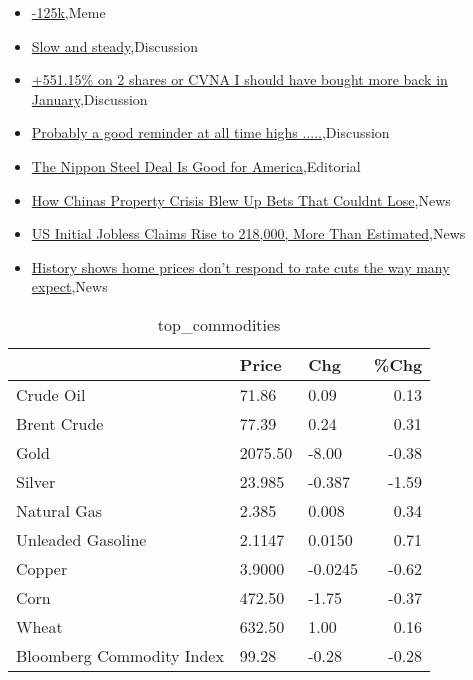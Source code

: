 \documentclass{article}%
\begin{document}
%
\begin{itemize}%
\item%
\href{https://reddit.com/r/wallstreetbets/comments/18tidzq/125k/}{-125k},Meme%
\item%
\href{https://reddit.com/r/StockMarket/comments/18tf3ja/slow\_and\_steady/}{Slow and steady},Discussion%
\item%
\href{https://reddit.com/r/StockMarket/comments/18t4gma/55115\_on\_2\_shares\_or\_cvna\_i\_should\_have\_bought/}{+551.15\% on 2 shares or CVNA I should have bought more back in January},Discussion%
\item%
\href{https://reddit.com/r/StockMarket/comments/18syo4v/probably\_a\_good\_reminder\_at\_all\_time\_highs/}{Probably a good reminder at all time highs .....},Discussion%
\item%
\href{https://reddit.com/r/Economics/comments/18t8tnw/the\_nippon\_steel\_deal\_is\_good\_for\_america/}{The Nippon Steel Deal Is Good for America},Editorial%
\item%
\href{https://reddit.com/r/Economics/comments/18t0yli/how\_chinas\_property\_crisis\_blew\_up\_bets\_that/}{How Chinas Property Crisis Blew Up Bets That Couldnt Lose},News%
\item%
\href{https://reddit.com/r/Economics/comments/18sym66/us\_initial\_jobless\_claims\_rise\_to\_218000\_more/}{US Initial Jobless Claims Rise to 218,000, More Than Estimated},News%
\item%
\href{https://reddit.com/r/Economics/comments/18svvg2/history\_shows\_home\_prices\_dont\_respond\_to\_rate/}{History shows home prices don't respond to rate cuts the way many expect},News%
\end{itemize}%


\begin{table}[htbp]%
\caption{top\_commodities}%
\centering%
\begin{adjustbox}{width=1\textwidth}%
\begin{tabular}{lllr}
\toprule
                          &   Price &     Chg &  \%Chg \\
\midrule
               Crude Oil  &   71.86 &    0.09 &  0.13 \\
             Brent Crude  &   77.39 &    0.24 &  0.31 \\
                    Gold  & 2075.50 &   -8.00 & -0.38 \\
                  Silver  &  23.985 &  -0.387 & -1.59 \\
             Natural Gas  &   2.385 &   0.008 &  0.34 \\
       Unleaded Gasoline  &  2.1147 &  0.0150 &  0.71 \\
                  Copper  &  3.9000 & -0.0245 & -0.62 \\
                    Corn  &  472.50 &   -1.75 & -0.37 \\
                   Wheat  &  632.50 &    1.00 &  0.16 \\
Bloomberg Commodity Index &   99.28 &   -0.28 & -0.28 \\
\bottomrule
\end{tabular}
%
\end{adjustbox}%
\end{table}
\end{document}
